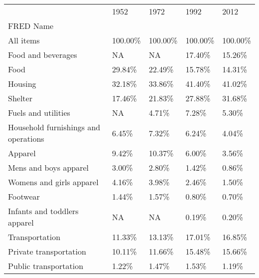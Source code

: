 \documentclass[12pt]{article}
\begin{document}
 \begin{adjustwidth}{-2cm}{}
\begin{table}


\begin{tabular}{lllll}
{} & {1952} & {1972} & {1992} & {2012} \\
{FRED Name} & {} & {} & {} & {} \\
\hspace*{0ex}All items & 100.00\% & 100.00\% & 100.00\% & 100.00\% \\
\hspace*{4ex}Food and beverages & NA & NA & 17.40\% & 15.26\% \\
\hspace*{8ex}Food & 29.84\% & 22.49\% & 15.78\% & 14.31\% \\
\hspace*{4ex}Housing & 32.18\% & 33.86\% & 41.40\% & 41.02\% \\
\hspace*{8ex}Shelter & 17.46\% & 21.83\% & 27.88\% & 31.68\% \\
\hspace*{8ex}Fuels and utilities & NA & 4.71\% & 7.28\% & 5.30\% \\
\hspace*{8ex}Household furnishings and operations & 6.45\% & 7.32\% & 6.24\% & 4.04\% \\
\hspace*{4ex}Apparel & 9.42\% & 10.37\% & 6.00\% & 3.56\% \\
\hspace*{8ex}Mens and boys apparel & 3.00\% & 2.80\% & 1.42\% & 0.86\% \\
\hspace*{8ex}Womens and girls apparel & 4.16\% & 3.98\% & 2.46\% & 1.50\% \\
\hspace*{8ex}Footwear & 1.44\% & 1.57\% & 0.80\% & 0.70\% \\
\hspace*{8ex}Infants and toddlers apparel & NA & NA & 0.19\% & 0.20\% \\
\hspace*{4ex}Transportation & 11.33\% & 13.13\% & 17.01\% & 16.85\% \\
\hspace*{8ex}Private transportation & 10.11\% & 11.66\% & 15.48\% & 15.66\% \\
\hspace*{8ex}Public transportation & 1.22\% & 1.47\% & 1.53\% & 1.19\% \\

\end{tabular}
\end{table}
\end{adjustwidth}
\end{document}
